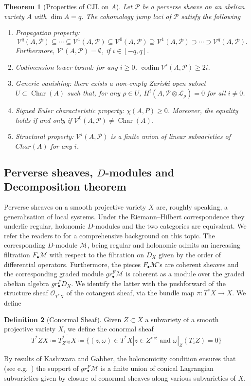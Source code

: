 \documentclass[12pt,reqno]{amsart}
\newtheorem{theorem}{Theorem}
\theoremstyle{question}
\theoremstyle{definition}
\newtheorem{definition}[theorem]{Definition}
\theoremstyle{remark}
\theoremstyle{cited}
\theoremstyle{citeddef}
\DeclareMathOperator{\codim}{codim}              %
\DeclareMathOperator{\reg}{reg}                  %
\DeclareMathOperator{\Char}{Char}
\newcommand{\sL}{\mathcal{L}}
\newcommand{\sM}{\mathcal{M}}
\newcommand{\sO}{\mathcal{O}}
\newcommand{\sP}{\mathcal{P}}
\newcommand\sV{{\mathcal V}}
\begin{document}
\begin{theorem}[Properties of CJL on $A$]
Let $\sP$ be a perverse sheave on an abelian variety $A$ with $\dim A = q$.
The
cohomology jump loci of $\sP$ satisfy the following
\begin{enumerate}
	\item Propagation property:
\[\sV^q(A, \sP) \subseteq \cdots\subseteq \sV^1(A, \sP) 
\subseteq \sV^0(A, \sP) \supseteq \sV^1(A, \sP) \supset\cdots\supset \sV^q(A, \sP).\]
Furthermore, $\sV^i(A, \sP) = \emptyset$, if $i \in [-q, q]$.
\item Codimension lower bound: for any $i \geq 0$,
$\codim \sV^i(A, \sP) \geq 2i$.
\item Generic vanishing: there exists a non-empty Zariski open subset $U \subset \Char(A)$
such that, for any $\rho\in U$, $H^i(A, \sP 
\otimes \sL_{\rho}) = 0$ for all $i \neq 0$.
\item Signed Euler characteristic property:
$\chi(A, P) \geq 0$.
Moreover, the equality holds if and only if $\sV^0(A, \sP) \neq \Char(A)$.
\item Structural property: $\sV^i(A, \sP)$ is a finite union of linear subvarieties of $Char(A)$ for any $i$.
\end{enumerate}
\label{thm:gvperverse}
\end{theorem} 




\subsection{Perverse sheaves, $D$-modules and Decomposition theorem}\label{sec:perverse}
Perverse sheaves on a smooth projective variety $X$ are, roughly speaking, a generalisation of local systems. 
Under the Riemann--Hilbert correspondence they underlie regular, holonomic $D$-modules and the two categories are equivalent. 
We refer the readers to \cite[Chapter 6,7]{HTT} for a 
comprehensive background on this topic. 
The corresponding $D$-module $\sM$, being regular and holonomic admits an increasing
 filtration $F_{\bullet}\sM$ with respect to the filtration on $D_X$
given by the order of differential operators. Furthermore, the pieces $F_{\bullet}\sM$'s are coherent sheaves and the corresponding
graded module $gr^F_{\bullet}\sM$ is coherent as a module over the graded abelian algebra $gr^F_{\bullet}D_X$. We identify the latter
 with the pushforward of the
structure sheaf $\sO_{T^*X}$ of the cotangent sheaf, via the bundle map $\pi\colon T^*X\to X$. We define
\begin{definition}[Conormal Sheaf]
Given $Z\subset X$ a subvariety of a smooth projective variety $X$, we define the conormal sheaf 
\[T^*ZX\coloneqq \overline{T^*_{Z^{\reg}}X} \coloneqq \overline{\{(z,\omega)\in T^*X| z\in Z^{\reg} \text{ and } \omega|_{Z}(T_zZ) = 0\}}\]

\end{definition}
By results of Kashiwara and Gabber, the holonomicity condition ensures that (see e.g.\ \cite[Theorem E.3.6]{HTT}) the support of $gr^F_{\bullet}\sM$ is a finite union of
conical Lagrangian subvarieties given by closure of conormal sheaves along various subvarieties of $X$.
 
\end{document}
